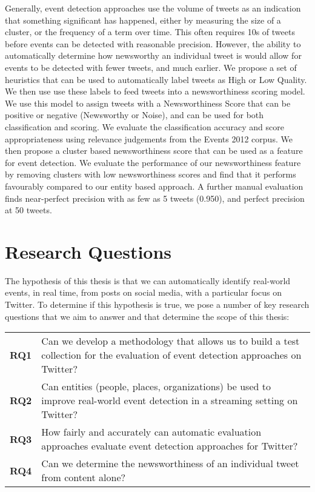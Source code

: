 Generally, event detection approaches use the volume of tweets as an indication that something significant has happened, either by measuring the size of a cluster, or the frequency of a term over time.
This often requires 10s of tweets before events can be detected with reasonable precision.
However, the ability to automatically determine how newsworthy an individual tweet is would allow for events to be detected with fewer tweets, and much earlier.
We propose a set of heuristics that can be used to automatically label tweets as High or Low Quality.
We then use use these labels to feed tweets into a newsworthiness scoring model.
We use this model to assign tweets with a Newsworthiness Score that can be positive or negative (Newsworthy or Noise), and can be used for both classification and scoring.
We evaluate the classification accuracy and score appropriateness using relevance judgements from the Events 2012 corpus.
We then propose a cluster based newsworthiness score that can be used as a feature for event detection.
We evaluate the performance of our newsworthiness feature by removing clusters with low newsworthiness scores and find that it performs favourably compared to our entity based approach.
A further manual evaluation finds near-perfect precision with as few as 5 tweets (0.950), and perfect precision at 50 tweets.

\section{Research Questions}
The hypothesis of this thesis is that we can automatically identify real-world events, in real time, from posts on social media, with a particular focus on Twitter.
To determine if this hypothesis is true, we pose a number of key research questions that we aim to answer and that determine the scope of this thesis:

\begin{tabulary}{\textwidth}{l L}
\textbf{RQ1} & Can we develop a methodology that allows us to build a test collection for the evaluation of event detection approaches on Twitter? \\

\textbf{RQ2} & Can entities (people, places, organizations) be used to improve real-world event detection in a streaming setting on Twitter? \\

\textbf{RQ3} & How fairly and accurately can automatic evaluation approaches evaluate event detection approaches for Twitter? \\

\textbf{RQ4} & Can we determine the newsworthiness of an individual tweet from content alone? \\
\end{tabulary}

